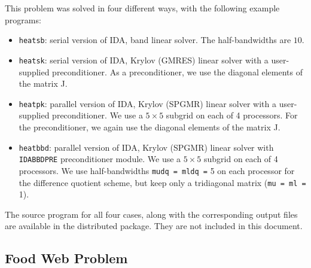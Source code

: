 This problem was solved in four different ways, with the following
example programs:
\begin{itemize}

\item {\tt heatsb}: serial version of IDA, band linear solver. The 
half-bandwidths are $10$.

\item {\tt heatsk}: serial version of IDA, Krylov (GMRES) linear solver with 
a user-supplied preconditioner. As a preconditioner, we use the diagonal
elements of the matrix J.

\item {\tt heatpk}: parallel version of IDA, Krylov (SPGMR) linear
solver with a user-supplied preconditioner. We use a $5 \times 5$ subgrid on
each of 4 processors. For the preconditioner, we again use the diagonal 
elements of the matrix J.

\item {\tt heatbbd}: parallel version of IDA, Krylov (SPGMR) linear
solver with {\tt IDABBDPRE} preconditioner module.  We use a $5 \times 5$ 
subgrid on each of 4 processors. We use half-bandwidths 
{\tt mudq = mldq =} 5 on each processor for the difference quotient
scheme, but keep only a tridiagonal matrix ({\tt mu = ml =} 1).

\end{itemize}

The source program for all four cases, along with the corresponding
output files are available in the distributed package. They are not
included in this document.


\subsection{Food Web Problem}

